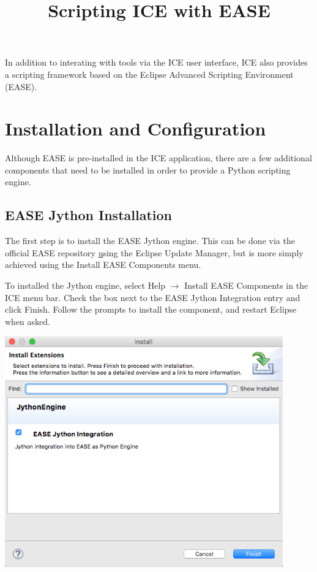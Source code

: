 \documentclass{article}
\begin{document}
\title{Scripting ICE with EASE}

In addition to interating with tools via the ICE user interface, ICE also
provides a scripting framework based on the Eclipse Advanced Scripting
Environment (EASE). 

\section{Installation and Configuration}

Although EASE is pre-installed in the ICE application, there are a few
additional components that need to be installed in order to provide a Python
scripting engine.

\subsection{EASE Jython Installation} 

The first step is to install the EASE Jython engine. This can be done via the
official EASE repository \href{https://dl.bintray.com/pontesegger/ease-jython/}
using the Eclipse Update Manager, but is more simply achieved using the Install
EASE Components menu.

To installed the Jython engine, select Help $\rightarrow$ Install
EASE Components in the ICE menu bar. Check the box next to the EASE Jython
Integration entry and click Finish. Follow the prompts to install the component,
and restart Eclipse when asked.

\begin{center}
\includegraphics[width=12cm]{images/ease-marketplace}
\end{center}
\end{document}
